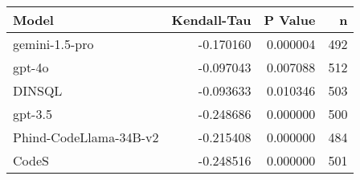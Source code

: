 \begin{tabular}{lrrr}
\toprule
Model & Kendall-Tau & P Value & n \\
\midrule
gemini-1.5-pro & -0.170160 & 0.000004 & 492 \\
gpt-4o & -0.097043 & 0.007088 & 512 \\
DINSQL & -0.093633 & 0.010346 & 503 \\
gpt-3.5 & -0.248686 & 0.000000 & 500 \\
Phind-CodeLlama-34B-v2 & -0.215408 & 0.000000 & 484 \\
CodeS & -0.248516 & 0.000000 & 501 \\
\bottomrule
\end{tabular}
